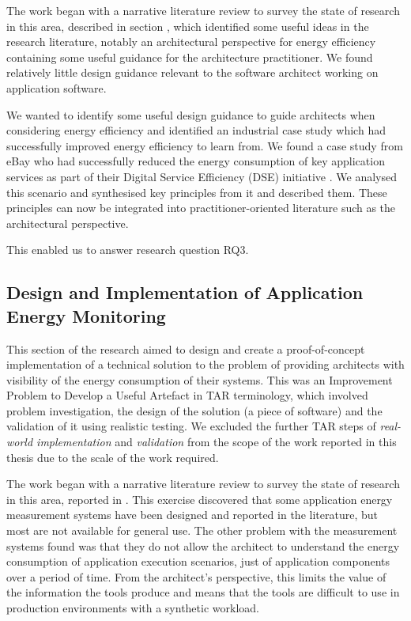 The work began with a narrative literature review to survey the state of research in this area, described in section , which identified some useful ideas in the research literature, notably an architectural perspective for energy efficiency \cite{jagroep2017-energyperspective} containing some useful guidance for the architecture practitioner.  We found relatively little design guidance relevant to the software architect working on application software.

We wanted to identify some useful design guidance to guide architects when considering energy efficiency and identified an industrial case study which had successfully improved energy efficiency to learn from.  We found a case study from eBay who had successfully reduced the energy consumption of key application services as part of their Digital Service Efficiency (DSE) initiative \cite{ebay2013-digitalefficiency}.  We analysed this scenario and synthesised key principles from it and described them.  These principles can now be integrated into practitioner-oriented literature such as the architectural perspective. 

This enabled us to answer research question RQ3.

\subsection{Design and Implementation of Application Energy Monitoring}

This section of the research aimed to design and create a proof-of-concept implementation of a technical solution to the problem of providing architects with visibility of the energy consumption of their systems.  This was an Improvement Problem to Develop a Useful Artefact in TAR terminology, which involved problem investigation, the design of the solution (a piece of software) and the validation of it using realistic testing.  We excluded the further TAR steps of \emph{real-world implementation} and \emph{validation} \cite{wieringa2012-tar} from the scope of the work reported in this thesis due to the scale of the work required.

The work began with a narrative literature review to survey the state of research in this area, reported in .  This exercise discovered that some application energy measurement systems have been designed and reported in the literature, but most are not available for general use.  The other problem with the measurement systems found was that they do not allow the architect to understand the energy consumption of application execution scenarios, just of application components over a period of time.  From the architect's perspective, this limits the value of the information the tools produce and means that the tools are difficult to use in production environments with a synthetic workload.

